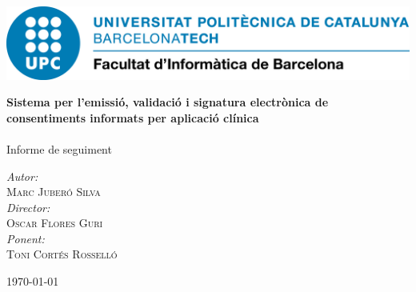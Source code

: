 \begin{titlepage}
\center

\includegraphics[scale=0.4]{img/UPC-FIB.png}
\vspace{2cm}


{\huge \bfseries Sistema per l'emissió, validació i signatura electrònica de consentiments informats per aplicació clínica}\\[0.4cm]
\HRule \\[0.2cm]


\Large Informe de seguiment

\vspace{10cm}

\emph{Autor:}\\ \large
 \textsc{Marc Juberó Silva}\\
\vspace{0.2cm}
\emph{Director:}\\ \large
 \textsc{Oscar Flores Guri}\\
\vspace{0.2cm}
\emph{Ponent:}\\ \large
 \textsc{Toni Cortés Rosselló}\\

\vspace{1cm}


{\large \today}\\[1cm] %

\vfill
\end{titlepage}